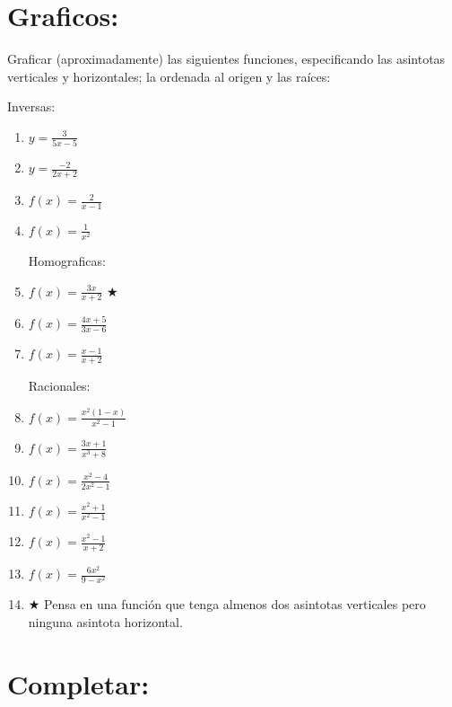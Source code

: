 \documentclass[a4paper,11pt,spanish,sans]{exam}
\begin{document}

\section{Graficos:}
Graficar (aproximadamente) las siguientes funciones, especificando las asintotas verticales y horizontales; la ordenada al origen y las raíces:


\begin{multicols}{2}

Inversas:
\begin{enumerate}%
\item $y=\frac{3}{5x-5}$
\item $y=\frac{-2}{2x+2}$
\item $f(x)=\frac{2}{x-1}$
\item $f(x)=\frac{1}{x^2}$

Homograficas:
\item $f(x)=\frac{3x}{x+2}$ $\bigstar$
\item $f(x)=\frac{4x+5}{3x-6}$
\item $f(x)=\frac{x-1}{x+2}$

\columnbreak

Racionales:
\item $f(x)=\frac{x^2(1-x)}{x^2-1}$
\item $f(x)=\frac{3x+1}{x^3+8}$%
\item $f(x)=\frac{x^2-4}{2x^2-1}$%
\item $f(x)=\frac{x^2+1}{x^2-1}$
\item $f(x)=\frac{x^2-1}{x+2}$
\item $f(x)=\frac{6x^2}{9-x^2}$
\item $\bigstar$ Pensa en una función que tenga almenos dos asintotas verticales pero ninguna asintota horizontal.

\end{enumerate}
\end{multicols}

\section{Completar:}
\end{document}
